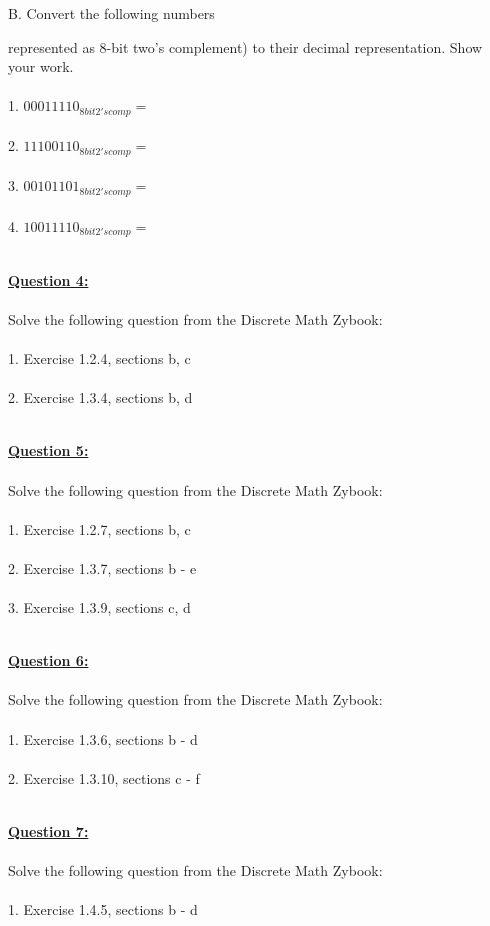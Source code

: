 \documentclass[11pt]{article}
\begin{document}
B. Convert the following numbers {represented as 8-bit two's complement) to their decimal representation. Show your work.\\\\
1. $00011110_{8 bit 2's comp} = $\\\\
2. $11100110_{8 bit 2's comp} = $\\\\
3. $00101101_{8 bit 2's comp} = $\\\\
4. $10011110_{8 bit 2's comp} = $\\\\

\pagebreak

\noindent \textbf{\ul{Question 4:}} \\
\\
Solve the following question from the Discrete Math Zybook: \\\\
1. Exercise 1.2.4, sections b, c \\\\
2. Exercise 1.3.4, sections b, d \\\\
\pagebreak

\noindent \textbf{\ul{Question 5:}} \\
\\
Solve the following question from the Discrete Math Zybook:\\\\
1. Exercise 1.2.7, sections b, c \\\\
2. Exercise 1.3.7, sections b - e \\\\
3. Exercise 1.3.9, sections c, d \\\\
\pagebreak

\noindent \textbf{\ul{Question 6:}} \\
\\
Solve the following question from the Discrete Math Zybook:\\\\
1. Exercise 1.3.6, sections b - d \\\\
2. Exercise 1.3.10, sections c - f \\\\
\pagebreak

\noindent \textbf{\ul{Question 7:}} \\
\\
Solve the following question from the Discrete Math Zybook:\\\\
1. Exercise 1.4.5, sections b - d \\\\

}
\end{document}

